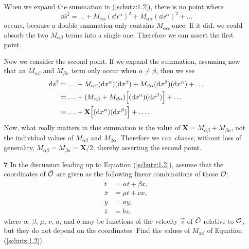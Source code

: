 \documentclass[gr-notes.tex]{subfiles}
\begin{document}
When we expand the summation in (\ref{schutz:1.2}), there is no point where
%
\begin{displaymath}
  \dd{\bar{s}}^2 =
  \ldots +
  M_{\alpha\alpha} (\dd{x^\alpha})^2 +
  M_{\alpha\alpha} (\dd{x^\alpha})^2 +
  \ldots
\end{displaymath}
occurs, because a double summation only contains $M_{\alpha\alpha}$ once. If it did, we could absorb the two $M_{\alpha\beta}$ terms into a single one. Therefore we can assert the first point.

Now we consider the second point. If we expand the summation, assuming now that an $M_{\alpha\beta}$ and $M_{\beta\alpha}$ term only occur when $\alpha \neq \beta$, then we see
%
\begin{align*}
  \dd{\bar{s}}^2 &=
  \ldots +
  M_{\alpha\beta} (\dd{x^\alpha}) (\dd{x^\beta}) +
  M_{\beta\alpha} (\dd{x^\beta}) (\dd{x^\alpha}) +
  \ldots
  \\ &=
  \ldots +
  (M_{\alpha\beta} + M_{\beta\alpha}) \qty[ (\dd{x^\alpha}) (\dd{x^\beta}) ] +
  \ldots
  \\ &=
  \ldots +
  \mathbf{X} \qty[ (\dd{x^\alpha}) (\dd{x^\beta}) ] +
  \ldots.
\end{align*}
%
Now, what really matters in this summation is the value of $\mathbf{X} = M_{\alpha\beta} + M_{\beta\alpha}$, not the individual values of $M_{\alpha\beta}$ and $M_{\beta\alpha}$. Therefore we can \emph{choose}, without loss of generality, $M_{\alpha\beta} = M_{\beta\alpha} = \mathbf{X}/2$, thereby asserting the second point.


\textbf{7}
In the discussion leading up to Equation (\ref{schutz:1.2}), assume that the coordinates of $\bar{\mathcal{O}}$ are given as the following linear combinations of those $\mathcal{O}$:
%
\begin{align*}
  \bar{t} &= \alpha t + \beta x,
  \\
  \bar{x} &= \mu t + \nu x,
  \\
  \bar{y} &= a y,
  \\
  \bar{z} &= b z,
\end{align*}
%
where $\alpha$, $\beta$, $\mu$, $\nu$, $a$, and $b$ may be functions of the velocity $\vec{v}$ of $\bar{\mathcal{O}}$ relative to $\mathcal{O}$, but they do not depend on the coordinates. Find the values of $M_{\alpha\beta}$ of Equation (\ref{schutz:1.2}).
\end{document}
